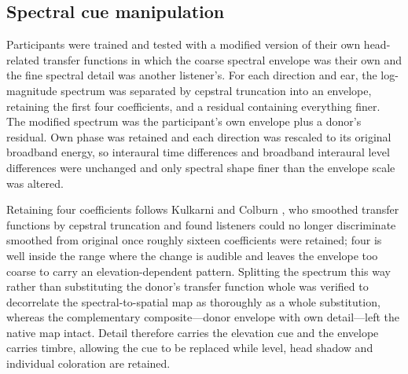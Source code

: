 %

\subsection{Spectral cue manipulation}

Participants were trained and tested with a modified version of their own
head-related transfer functions in which the coarse spectral envelope was their
own and the fine spectral detail was another listener's. For each direction and
ear, the log-magnitude spectrum was separated by cepstral truncation into an
envelope, retaining the first four coefficients, and a residual containing
everything finer. The modified spectrum was the participant's own envelope plus
a donor's residual. Own phase was retained and each direction was rescaled to
its original broadband energy, so interaural time differences and broadband
interaural level differences were unchanged and only spectral shape finer than
the envelope scale was altered.

Retaining four coefficients follows Kulkarni and Colburn
, who smoothed transfer functions by cepstral truncation and found listeners
could no longer discriminate smoothed from original once roughly sixteen
coefficients were retained; four is well inside the range where the change is
audible and leaves the envelope too coarse to carry an elevation-dependent
pattern. Splitting the spectrum this way rather than substituting the donor's
transfer function whole was verified to decorrelate the spectral-to-spatial map
as thoroughly as a whole substitution, whereas the complementary
composite---donor envelope with own detail---left the native map intact. Detail
therefore carries the elevation cue and the envelope carries timbre, allowing
the cue to be replaced while level, head shadow and individual coloration are
retained.

